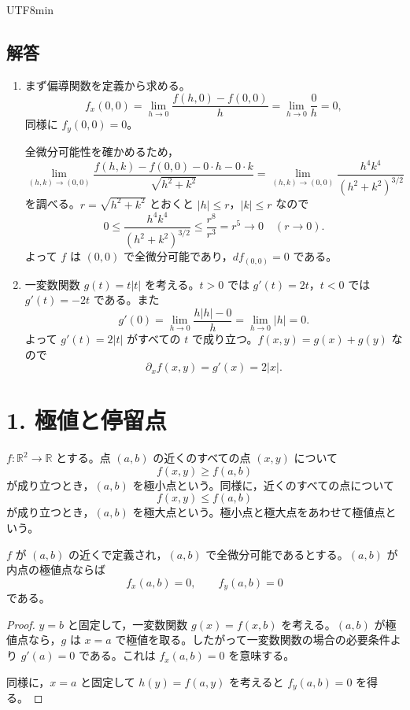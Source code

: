 \documentclass[a4paper,12pt]{article}
\newcommand{\R}{\mathbb{R}}
\begin{document}
\begin{CJK}{UTF8}{min}
\subsection*{解答}

\begin{enumerate}
\item
まず偏導関数を定義から求める。
$$
f_x(0,0)=\lim_{h\to0}\frac{f(h,0)-f(0,0)}{h}=\lim_{h\to0}\frac{0}{h}=0,
$$
同様に $f_y(0,0)=0$。

全微分可能性を確かめるため，
$$
\lim_{(h,k)\to(0,0)}\frac{f(h,k)-f(0,0)-0\cdot h-0\cdot k}{\sqrt{h^2+k^2}}
=\lim_{(h,k)\to(0,0)}\frac{h^4k^4}{(h^2+k^2)^{3/2}}
$$
を調べる。$r=\sqrt{h^2+k^2}$ とおくと $|h|\le r$，$|k|\le r$ なので
$$
0\le\frac{h^4k^4}{(h^2+k^2)^{3/2}}\le\frac{r^8}{r^3}=r^5\to0\quad(r\to0).
$$
よって $f$ は $(0,0)$ で全微分可能であり，$df_{(0,0)}=0$ である。

\item
一変数関数 $g(t)=t|t|$ を考える。$t>0$ では $g'(t)=2t$，$t<0$ では
$g'(t)=-2t$ である。また
$$
g'(0)=\lim_{h\to0}\frac{h|h|-0}{h}=\lim_{h\to0}|h|=0.
$$
よって $g'(t)=2|t|$ がすべての $t$ で成り立つ。$f(x,y)=g(x)+g(y)$ なので
$$
\partial_x f(x,y)=g'(x)=2|x|.
$$
\end{enumerate}

\section*{1. 極値と停留点}

\begin{definition}
$f:\R^2\to\R$ とする。点 $(a,b)$ の近くのすべての点 $(x,y)$ について
$$
f(x,y)\ge f(a,b)
$$
が成り立つとき，$(a,b)$ を極小点という。同様に，近くのすべての点について
$$
f(x,y)\le f(a,b)
$$
が成り立つとき，$(a,b)$ を極大点という。極小点と極大点をあわせて極値点という。
\end{definition}

\begin{theorem}[極値を取るための必要条件]
$f$ が $(a,b)$ の近くで定義され，$(a,b)$ で全微分可能であるとする。$(a,b)$ が内点の極値点ならば
$$
f_x(a,b)=0,\qquad f_y(a,b)=0
$$
である。
\end{theorem}

\begin{proof}
$y=b$ と固定して，一変数関数 $g(x)=f(x,b)$ を考える。$(a,b)$ が極値点なら，$g$ は $x=a$ で極値を取る。したがって一変数関数の場合の必要条件より $g'(a)=0$ である。これは $f_x(a,b)=0$ を意味する。

同様に，$x=a$ と固定して $h(y)=f(a,y)$ を考えると $f_y(a,b)=0$ を得る。
\end{proof}


\end{CJK}
\end{document}

